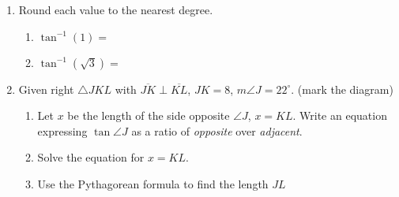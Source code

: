 \documentclass[12pt, twoside]{article}
\begin{document}
\begin{enumerate}
    \item Round each value to the nearest degree.  \vspace{.5cm}
    \begin{multicols}{2}
      \begin{enumerate}
        \item $\tan^{-1} (1) = $ \vspace{1cm}
        \item $\tan^{-1} (\sqrt{3}) =$
      \end{enumerate}
    \end{multicols} \vspace{1cm}

  \item Given right $\triangle JKL$ with $\overline{JK} \perp \overline{KL}$, $JK=8$, $m\angle J=22^\circ$. (mark the diagram)
      \begin{enumerate}
        \item Let $x$ be the length of the side opposite $\angle J$, $x=KL$. Write an equation expressing $\tan \angle J$ as a ratio of \emph{opposite} over \emph{adjacent}.  
      \begin{flushright}
        \end{flushright}
        \item Solve the equation for $x=KL$. \vspace{3cm}
        \item Use the Pythagorean formula to find the length $JL$
      \end{enumerate}

\end{enumerate}
\end{document}
